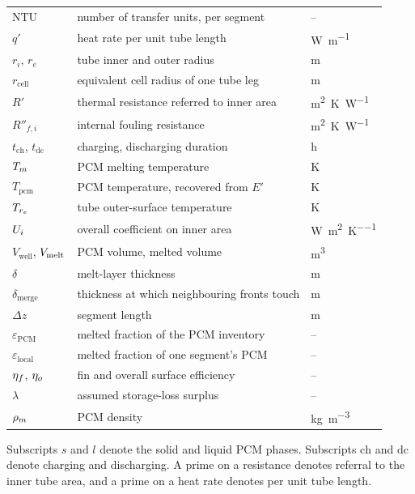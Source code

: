 \begin{longtable}{@{}l l l@{}}
$\mathrm{NTU}$ & number of transfer units, per segment & -- \\
$q'$ & heat rate per unit tube length & \si{\watt\per\meter} \\
$r_{i}$, $r_{e}$ & tube inner and outer radius & \si{\meter} \\
$r_{\mathrm{cell}}$ & equivalent cell radius of one tube leg & \si{\meter} \\
$R'$ & thermal resistance referred to inner area & \si{\meter\squared\kelvin\per\watt} \\
$R''_{f,i}$ & internal fouling resistance & \si{\meter\squared\kelvin\per\watt} \\
$t_{\mathrm{ch}}$, $t_{\mathrm{dc}}$ & charging, discharging duration & \si{\hour} \\
$T_{m}$ & PCM melting temperature & \si{\kelvin} \\
$T_{\mathrm{pcm}}$ & PCM temperature, recovered from $E'$ & \si{\kelvin} \\
$T_{r_{e}}$ & tube outer-surface temperature & \si{\kelvin} \\
$U_{i}$ & overall coefficient on inner area & \si{\watt\per\meter\squared\per\kelvin} \\
$V_{\mathrm{well}}$, $V_{\mathrm{melt}}$ & PCM volume, melted volume & \si{\meter\cubed} \\
$\delta$ & melt-layer thickness & \si{\meter} \\
$\delta_{\mathrm{merge}}$ & thickness at which neighbouring fronts touch & \si{\meter} \\
$\Delta z$ & segment length & \si{\meter} \\
$\varepsilon_{\mathrm{PCM}}$ & melted fraction of the PCM inventory & -- \\
$\varepsilon_{\mathrm{local}}$ & melted fraction of one segment's PCM & -- \\
$\eta_{f}$, $\eta_{o}$ & fin and overall surface efficiency & -- \\
$\lambda$ & assumed storage-loss surplus & -- \\
$\rho_{m}$ & PCM density & \si{\kilogram\per\meter\cubed} \\
\bottomrule
\end{longtable}

Subscripts $s$ and $l$ denote the solid and liquid PCM phases. Subscripts
$\mathrm{ch}$ and $\mathrm{dc}$ denote charging and discharging. A prime on a
resistance denotes referral to the inner tube area, and a prime on a heat rate
denotes per unit tube length.
